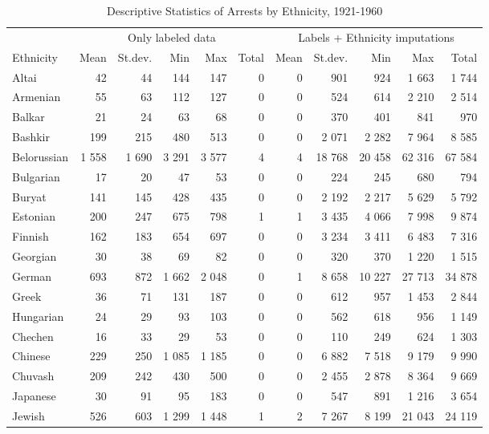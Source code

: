 \begin{table}[!h]

\caption{\label{tab:descr_stats_by_ethnicity}Descriptive Statistics of Arrests by Ethnicity, 1921-1960}
\centering
\fontsize{8}{10}\selectfont
\begin{tabular}{lrrrrrrrrrr}
\toprule
\multicolumn{1}{c}{ } & \multicolumn{5}{c}{Only labeled data} & \multicolumn{5}{c}{Labels + Ethnicity imputations} \\
\cmidrule(l{2pt}r{2pt}){2-6} \cmidrule(l{2pt}r{2pt}){7-11}
Ethnicity & Mean & St.dev. & Min & Max & Total & Mean & St.dev. & Min & Max & Total\\
\midrule
Altai & 42 & 44 & 144 & 147 & 0 & 0 & 901 & 924 & 1 663 & 1 744\\
Armenian & 55 & 63 & 112 & 127 & 0 & 0 & 524 & 614 & 2 210 & 2 514\\
Balkar & 21 & 24 & 63 & 68 & 0 & 0 & 370 & 401 & 841 & 970\\
Bashkir & 199 & 215 & 480 & 513 & 0 & 0 & 2 071 & 2 282 & 7 964 & 8 585\\
Belorussian & 1 558 & 1 690 & 3 291 & 3 577 & 4 & 4 & 18 768 & 20 458 & 62 316 & 67 584\\
Bulgarian & 17 & 20 & 47 & 53 & 0 & 0 & 224 & 245 & 680 & 794\\
Buryat & 141 & 145 & 428 & 435 & 0 & 0 & 2 192 & 2 217 & 5 629 & 5 792\\
Estonian & 200 & 247 & 675 & 798 & 1 & 1 & 3 435 & 4 066 & 7 998 & 9 874\\
Finnish & 162 & 183 & 654 & 697 & 0 & 0 & 3 234 & 3 411 & 6 483 & 7 316\\
Georgian & 30 & 38 & 69 & 82 & 0 & 0 & 320 & 370 & 1 220 & 1 515\\
German & 693 & 872 & 1 662 & 2 048 & 0 & 1 & 8 658 & 10 227 & 27 713 & 34 878\\
Greek & 36 & 71 & 131 & 187 & 0 & 0 & 612 & 957 & 1 453 & 2 844\\
Hungarian & 24 & 29 & 93 & 103 & 0 & 0 & 562 & 618 & 956 & 1 149\\
Chechen & 16 & 33 & 29 & 53 & 0 & 0 & 110 & 249 & 624 & 1 303\\
Chinese & 229 & 250 & 1 085 & 1 185 & 0 & 0 & 6 882 & 7 518 & 9 179 & 9 990\\
Chuvash & 209 & 242 & 430 & 500 & 0 & 0 & 2 455 & 2 878 & 8 364 & 9 669\\
Japanese & 30 & 91 & 95 & 183 & 0 & 0 & 547 & 891 & 1 216 & 3 654\\
Jewish & 526 & 603 & 1 299 & 1 448 & 1 & 2 & 7 267 & 8 199 & 21 043 & 24 119\\

\end{tabular}
\end{table}
